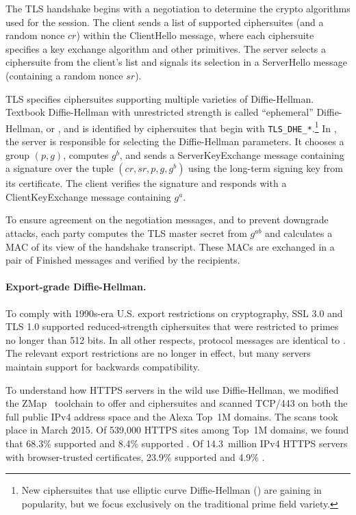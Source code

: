 The TLS handshake begins with a negotiation to determine the crypto
algorithms used for the session. The client sends a list of supported
ciphersuites (and a random nonce $cr$) within the \textsf{ClientHello}
message, where each ciphersuite specifies a key exchange algorithm and other
primitives. The server selects a ciphersuite from the client's list and
signals its selection in a \textsf{ServerHello} message (containing a random
nonce $sr$).

TLS specifies ciphersuites supporting multiple varieties of Diffie-Hellman.
Textbook Diffie-Hellman with unrestricted strength is called ``ephemeral''
Diffie-Hellman, or \dhe{}, and is identified by ciphersuites that begin with
\texttt{TLS\_DHE\_*}.\footnote{\small New ciphersuites that use elliptic
curve Diffie-Hellman (\ecdhe{}) are gaining in popularity, but we focus
exclusively on the traditional prime field variety.} In \dhe{}, the server is
responsible for selecting the Diffie-Hellman parameters. It chooses a group
$(p,g)$, computes $g^b$, and sends a \textsf{ServerKeyExchange} message
containing a signature over the tuple $(cr, sr, p, g, g^b)$ using the
long-term signing key from its certificate. The client verifies the signature
and responds with a \textsf{ClientKeyExchange} message containing $g^a$.

To ensure agreement on the negotiation messages, and to prevent downgrade
attacks, each party computes the TLS master secret from $g^{ab}$ and
calculates a MAC of its view of the handshake transcript. These MACs are
exchanged in a pair of \textsf{Finished} messages and verified by the
recipients.

\paragraph{Export-grade Diffie-Hellman.}
To comply with 1990s-era U.S. export restrictions on cryptography, SSL 3.0
and TLS 1.0 supported reduced-strength \dheexp{} ciphersuites that were
restricted to primes no longer than 512 bits. In all other respects,
\dheexp{} protocol messages are identical to \dhe{}. The relevant export
restrictions are no longer in effect, but many servers maintain support for
backwards compatibility.

To understand how HTTPS servers in the wild use Diffie-Hellman, we modified
the ZMap~\cite{zmap-2013} toolchain to offer \dhe{} and \dheexp{}
ciphersuites and scanned TCP/443 on both the full public IPv4 address space
and the Alexa Top~1M domains. The scans took place in March 2015. Of 539,000
HTTPS sites among Top~1M domains, we found that 68.3\% supported \dhe{} and
8.4\% supported \dheexp{}. Of 14.3~million IPv4 HTTPS servers with
browser-trusted certificates, 23.9\% supported \dhe{} and 4.9\% \dheexp{}.

